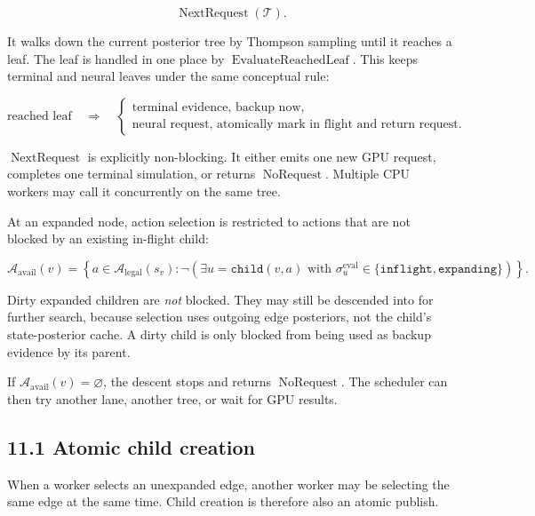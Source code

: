 \documentclass[11pt]{article}
\newcommand{\Tree}{\mathcal{T}}
\newcommand{\Legal}{\mathcal{A}_{\mathrm{legal}}}
\newcommand{\Available}{\mathcal{A}_{\mathrm{avail}}}
\newcommand{\EvaluateReachedLeaf}{\operatorname{EvaluateReachedLeaf}}
\newcommand{\NextRequest}{\operatorname{NextRequest}}
\newcommand{\NoRequest}{\operatorname{NoRequest}}
\begin{document}
\[
\NextRequest(\Tree).
\]

It walks down the current posterior tree by Thompson sampling until it reaches a
leaf. The leaf is handled in one place by \(\EvaluateReachedLeaf\). This keeps
terminal and neural leaves under the same conceptual rule:

\[
\text{reached leaf}
\quad\Longrightarrow\quad
\begin{cases}
\text{terminal evidence, backup now},\\
\text{neural request, atomically mark in flight and return request}.
\end{cases}
\]

\(\NextRequest\) is explicitly non-blocking. It either emits one new GPU request,
completes one terminal simulation, or returns \(\NoRequest\). Multiple CPU
workers may call it concurrently on the same tree.

At an expanded node, action selection is restricted to actions that are not
blocked by an existing in-flight child:

\[
\Available(v)
=
\left\{
 a\in\Legal(s_v):
 \neg\left(
   \exists u=\texttt{child}(v,a)
   \text{ with }
   \sigma^{\mathrm{eval}}_u\in\{\texttt{inflight},\texttt{expanding}\}
 \right)
\right\}.
\]

Dirty expanded children are \emph{not} blocked. They may still be descended into
for further search, because selection uses outgoing edge posteriors, not the
child's state-posterior cache. A dirty child is only blocked from being used as
backup evidence by its parent.

If \(\Available(v)=\varnothing\), the descent stops and returns \(\NoRequest\).
The scheduler can then try another lane, another tree, or wait for GPU results.

\subsection*{11.1 Atomic child creation}

When a worker selects an unexpanded edge, another worker may be selecting the
same edge at the same time. Child creation is therefore also an atomic publish.
\end{document}
